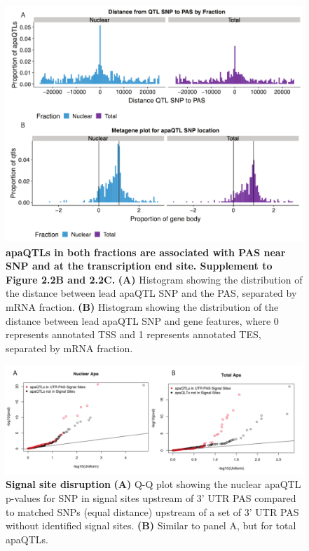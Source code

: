 \begin{figure}[!htb]
\centering
\includegraphics[width=5in]{img/ch02/Fig2_figuresupplement4.pdf}
\caption[apaQTLs in both fractions are associated with PAS near SNP and at the transcription end site.  Supplement to Figure 2.2B and 2.2C.]{\textbf{apaQTLs in both fractions are associated with PAS near SNP and at the transcription end site.  Supplement to Figure 2.2B and 2.2C.} {\bf (A)} Histogram showing the distribution of the distance between lead apaQTL SNP and the PAS, separated by mRNA fraction. {\bf (B)} Histogram showing the distribution of the distance between lead apaQTL SNP and gene features, where 0 represents annotated TSS and 1 represents annotated TES, separated by mRNA fraction.}
\label{fig:totQTLloc}
\end{figure}
\clearpage

\begin{figure}[!htb]
\centering
\includegraphics[width=5in]{img/ch02/Fig2_figuresupplement5.pdf}
\caption[Signal site disruption]{\textbf{Signal site disruption} {\bf (A)} Q-Q plot showing the nuclear apaQTL p-values for SNP in signal sites upstream of 3' UTR PAS compared to matched SNPs (equal distance) upstream of a set of 3' UTR PAS without identified signal sites. {\bf (B)} Similar to panel A, but for total apaQTLs.}
\label{fig:ssDisrupt}
\end{figure}
\clearpage

